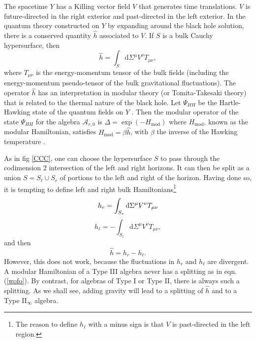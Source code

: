 \documentclass[11pt,a4paper]{article}
\def\mod{{\mathrm{mod}}}
\def\be{\begin{equation}}
\def\ee{\end{equation}}
\def\h{\widehat}
\def\A{{\mathcal A}}
\def\d{{\mathrm d}}
\def\h{\widehat}
\begin{document}
The spacetime $Y$  has a Killing vector field $V$
that generates time translations.   $V$ is future-directed in the right exterior and past-directed
in the left exterior.   In the quantum theory constructed on $Y$ by expanding around the black hole
solution, there is a conserved quantity $\h h$ associated to $V$.  If $S$ is a bulk Cauchy hypersurface, then 
\be\label{concharge} \h h =\int_S\d \Sigma^\mu V^\nu  T_{\mu\nu}, \ee
where $T_{\mu\nu}$ is the energy-momentum tensor of the bulk fields (including
the energy-momentum pseudo-tensor of the bulk gravitational fluctuations).
The operator $\h h$ has an interpretation in modular theory (or Tomita-Takesaki theory) that is related to the thermal nature of the black hole.    
Let  $\Psi_{HH}$ be the Hartle-Hawking state of the quantum fields on $Y$ \cite{HH,I}. Then the modular operator
of the state $\Psi_{HH}$ for the algebra $\A_{r,0}$ is $\Delta=\exp(- H_\mod )$ where $H_\mod$, known as the modular Hamiltonian, satisfies  $H_\mod=\beta \h h$, 
with $\beta$  the
inverse of the Hawking temperature \cite{BW,Sewell}.

As in fig \ref{CCC}, one  can choose the hypersurface $S$  to pass through the codimension 2 intersection of the left and right horizons.
It can then be split as a union $S=S_\ell \cup S_r$ of portions to the left and right of the horizon.   
Having done so, it is tempting to define left and right bulk Hamiltonians\footnote{The reason to define $h_\ell$ with a minus sign is that $V$ is past-directed in the left
region.}
\be\notag h_r  =  \int_{S_r} \d \Sigma^\mu V^\nu  T_{\mu\nu}  \ee
 \be\label{zelf}  h_\ell = - \int_{S_\ell} \d \Sigma^\mu V^\nu  T_{\mu\nu} ,\ee
   and then
   \be\label{wofo} \h h = h_r - h_\ell. \ee
   However, this does not work, because the fluctuations in $h_r$ and $h_\ell$ are divergent. 
   A modular Hamiltonian of a Type III algebra never has a splitting as in eqn. (\ref{wofo}).  By contrast, for algebras of 
   Type I or Type II, there is always such a splitting. As we shall see, adding gravity will lead to a splitting of $\h h$ and  to a Type II$_\infty$ algebra.
\end{document}
